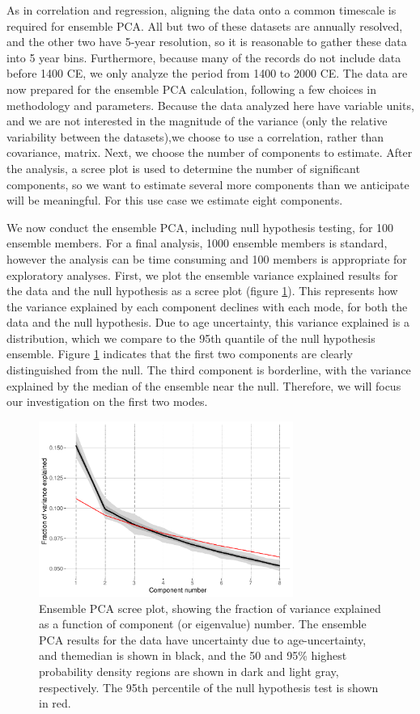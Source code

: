 \documentclass[gchron, manuscript]{copernicus}
\begin{document}
As in correlation and regression, aligning the data onto a common timescale is required for ensemble PCA.
All but two of these datasets are annually resolved, and the other two have 5-year resolution, so it is reasonable to gather these data into 5 year bins.
Furthermore, because many of the records do not include data before 1400 CE, we only analyze the period from 1400 to 2000 CE.
The data are now prepared for the ensemble PCA calculation, following a few choices in methodology and parameters.
Because the data analyzed here have variable units, and we are not interested in the magnitude of the variance (only the relative variability between the datasets),we choose to use a correlation, rather than covariance, matrix.
Next, we choose the number of components to estimate.
After the analysis, a scree plot is used to determine the number of significant components, so we want to estimate several more components than we anticipate will be meaningful.
For this use case we estimate eight components.

We now conduct the ensemble PCA, including null hypothesis testing, for 100 ensemble members.
For a final analysis, 1000 ensemble members is standard, however the analysis can be time consuming and 100 members is appropriate for exploratory analyses.
First, we plot the ensemble variance explained results for the data and the null hypothesis as a scree plot (figure \ref{fig:scree}).
This represents how the variance explained by each component declines with each mode, for both the data and the null hypothesis. Due to age uncertainty, this variance explained is a distribution, which we compare to the 95th quantile of the null hypothesis ensemble.
Figure \ref{fig:scree} indicates that the first two components are clearly distinguished from the null.
The third component is borderline, with the variance explained by the median of the ensemble near the null.
Therefore, we will focus our investigation on the first two modes.

\begin{figure}
\includegraphics[width=8.3cm]{geoChronR-paper_files/figure-latex/scree-1} \caption{Ensemble PCA scree plot, showing the fraction of variance explained as a function of component (or eigenvalue) number. The ensemble PCA results for the data have uncertainty due to age-uncertainty, and themedian is shown in black, and the 50 and 95\% highest probability density regions are shown in dark and light gray, respectively. The 95th percentile of the null hypothesis test is shown in red.}\label{fig:scree}
\end{figure}
\end{document}
